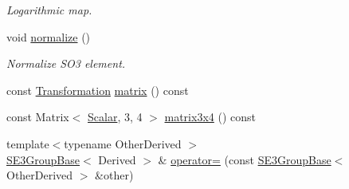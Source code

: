 \begin{DoxyCompactItemize}
\begin{DoxyCompactList}\small\item\em Logarithmic map. \end{DoxyCompactList}\item 
void \hyperlink{class_sophus_1_1_s_e3_group_base_a14e27b432193b7406753a610ffca6584}{normalize} ()
\begin{DoxyCompactList}\small\item\em Normalize S\+O3 element. \end{DoxyCompactList}\item 
const \hyperlink{class_sophus_1_1_s_e3_group_base_a426ebd53f324a4fd6d36c28028f967f1}{Transformation} \hyperlink{class_sophus_1_1_s_e3_group_base_a89227c0f5a9243d1fd04affc9f729d71}{matrix} () const 
\item 
const Matrix$<$ \hyperlink{class_sophus_1_1_s_e3_group_base_aa3db86a2cabe32d3c299dda41af181cc}{Scalar}, 3, 4 $>$ \hyperlink{class_sophus_1_1_s_e3_group_base_afdc9737824ea728d141604df6768cb74}{matrix3x4} () const 
\item 
{\footnotesize template$<$typename Other\+Derived $>$ }\\\hyperlink{class_sophus_1_1_s_e3_group_base}{S\+E3\+Group\+Base}$<$ Derived $>$ \& \hyperlink{class_sophus_1_1_s_e3_group_base_aa78587ba4e5047dd50235502aa60f452}{operator=} (const \hyperlink{class_sophus_1_1_s_e3_group_base}{S\+E3\+Group\+Base}$<$ Other\+Derived $>$ \&other)\hypertarget{class_sophus_1_1_s_e3_group_base_aa78587ba4e5047dd50235502aa60f452}{}\label{class_sophus_1_1_s_e3_group_base_aa78587ba4e5047dd50235502aa60f452}


\end{DoxyCompactItemize}
